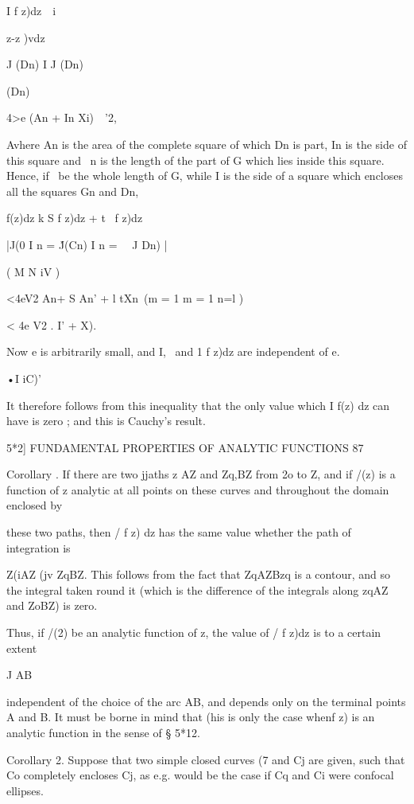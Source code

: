 I f z)dz\ \  i \ \ {z-z )vdz\ 

J (Dn) I J (Dn) 



(Dn) 

  4>e (An + In Xi)\ \  '2, 

Avhere An is the area of the complete square of which Dn is part, In is the 
side of this square and \ n is the length of the part of G which lies inside this 
square. Hence, if \ be the whole length of G, while I is the side of a square 
which encloses all the squares Gn and Dn, 

f(z)dz k S f z)dz  +  t \ f z)dz 

|J(0 I n = \'J(Cn) I n = \ \  J Dn) | 

( M N iV ) 

<4eV2   An+ S An' + l tXn\ 
(m = 1 m = 1 n=l ) 

< 4e V2 .  I' +  X). 

Now e is arbitrarily small, and I, \ and 1 f z)dz are independent of e. 

•I iC)' 

It therefore follows from this inequality that the only value which I f(z) dz 
can have is zero ; and this is Cauchy's result. 



5*2] FUNDAMENTAL PROPERTIES OF ANALYTIC FUNCTIONS 87 

Corollary .  If there are two jjaths z AZ and Zq,BZ from 2o to Z, and if /(z) is a 
function of z analytic at all points on these curves and throughout the domain enclosed by 

these two paths, then / f z) dz has the same value whether the path of integration is 

Z(iAZ (jv ZqBZ. This follows from the fact that ZqAZBzq is a contour, and so the integral 
taken round it (which is the difference of the integrals along zqAZ and ZoBZ) is zero. 

Thus, if /(2) be an analytic function of z, the value of / f z)dz is to a certain extent 

J AB 

independent of the choice of the arc AB, and depends only on the terminal points A and B. 
It must be borne in mind that (his is only the case whenf z) is an analytic function in the 
sense of § 5*12. 

Corollary 2. Suppose that two simple closed curves (7  and Cj are given, such that Co 
completely encloses Cj, as e.g. would be the case if Cq and Ci were confocal ellipses. 

}
